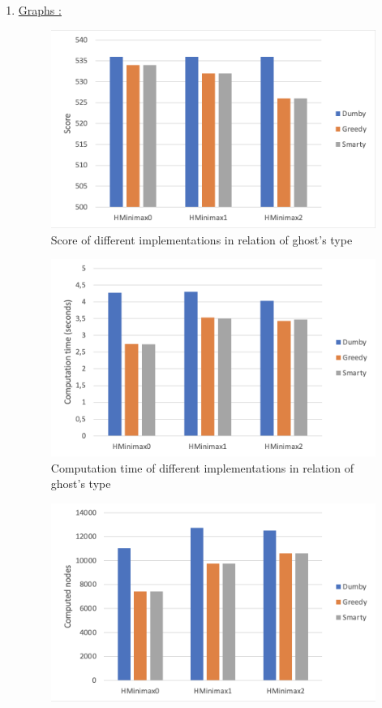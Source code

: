 \documentclass{article}
\begin{document}
\begin{enumerate}[label=\alph*.,leftmargin=*]
    \item \underline{Graphs :}
    \begin{figure}[!h]
      \centering
      \includegraphics[scale = 0.45]{score.png}
      \caption{Score of different implementations in relation of ghost's type}  
    \end{figure}
    \begin{figure}[!h]
        \centering
        \includegraphics[scale = 0.45]{time.png}
        \caption{Computation time of different implementations in relation of ghost's type}  
    \end{figure}
    \begin{figure}[!h]
        \centering
        \includegraphics[scale = 0.45]{nodes.png}

\end{figure}
\end{enumerate}
\end{document}
